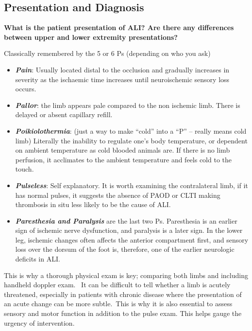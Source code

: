 \documentclass[
]{book}
\begin{document}
\hypertarget{presentation-and-diagnosis-1}{%
\subsection{Presentation and Diagnosis}\label{presentation-and-diagnosis-1}}

\textbf{What is the patient presentation of ALI? Are there any differences between
upper and lower extremity presentations?}

Classically remembered by the 5 or 6 Ps (depending on who you ask)

\begin{itemize}
\item
  \textbf{\emph{Pain}}: Usually located distal to the occlusion and gradually
  increases in severity as the ischaemic time increases until
  neuroischemic sensory loss occurs.
\item
  \textbf{\emph{Pallor}}: the limb appears pale compared to the non ischemic limb.
  There is delayed or absent capillary refill.
\item
  \textbf{\emph{Poikiolothermia}}: (just a way to make ``cold'' into a ``P'' -- really
  means cold limb) Literally the inability to regulate one's
  body temperature, or dependent on ambient temperature as cold
  blooded animals are. If there is no limb perfusion, it acclimates to
  the ambient temperature and feels cold to the touch.~
\item
  \textbf{\emph{Pulseless}}: Self explanatory. It is worth examining the contralateral
  limb, if it has normal pulses, it suggests the absence of PAOD or
  CLTI making thrombosis in situ less likely to be the cause of ALI.~
\item
  \textbf{\emph{Paresthesia and Paralysis}} are the last two Ps. Paresthesia is an
  earlier sign of ischemic nerve dysfunction, and paralysis is a later
  sign. In the lower leg, ischemic changes often affects the
  anterior compartment first, and sensory loss over the dorsum of the
  foot is, therefore, one of the earlier neurologic deficits in ALI.
\end{itemize}

This is why a thorough physical exam is key; comparing both limbs
and including handheld doppler exam.~ It can be difficult to tell whether
a limb is acutely threatened, especially in patients with chronic disease
where the presentation of an acute change can be more subtle.~This is why
it is also essential to assess sensory and motor function in addition
to the pulse exam. This helps gauge the urgency of intervention.
\end{document}
